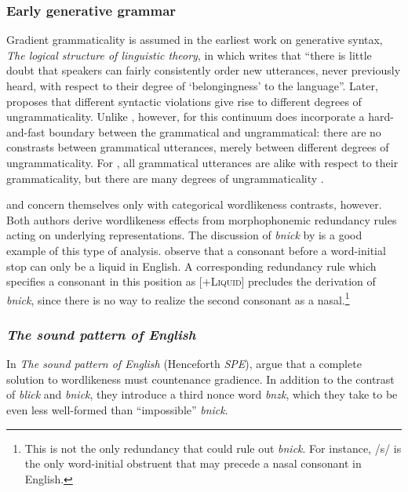 \subsubsection{Early generative grammar}

Gradient grammaticality is assumed in the earliest work on generative syntax, \emph{The logical structure of linguistic theory}, in which \citet[][132]{LSLT} writes that ``there is little doubt that speakers can fairly consistently order new utterances, never previously heard, with respect to their degree of `belongingness' to the language''. Later, \citet{ASPECTS} proposes that different syntactic violations give rise to different degrees of ungrammaticality. Unlike \citeauthor{Fischer-Jorgensen1952}, however, for \citeauthor{LSLT} this continuum does incorporate a hard-and-fast boundary between the grammatical and ungrammatical: there are no constrasts between grammatical utterances, merely between different degrees of ungrammaticality. For \citeauthor{LSLT}, all grammatical utterances are alike with respect to their grammaticality, but there are many degrees of ungrammaticality \citep[][61]{Schutze1996}.

\citet{Halle1962} and \citet{Stanley1967} concern themselves only with categorical wordlikeness contrasts, however. Both authors derive wordlikeness effects from morphophonemic redundancy rules acting on underlying representations. The discussion of \emph{bnick} by \citet[][101]{Chomsky1965} is a good example of this type of analysis. \citeauthor{Chomsky1965} observe that a consonant before a word-initial stop can only be a liquid in English. A corresponding redundancy rule which specifies a consonant in this position as [$+$\textsc{Liquid}] precludes the derivation of \emph{bnick}, since there is no way to realize the second consonant as a nasal.\footnote{This is not the only redundancy that could rule out \emph{bnick}. For instance, /s/ is the only word-initial obstruent that may precede a nasal consonant in English.}

\subsubsection{\emph{The sound pattern of English}} \label{2spe}

In \emph{The sound pattern of English} (Henceforth \emph{SPE}), \citet{SPE} argue that a complete solution to wordlikeness must countenance gradience. In addition to the contrast of \emph{blick} and \emph{bnick}, they introduce a third nonce word \emph{bnzk}, which they take to be even less well-formed than ``impossible'' \emph{bnick}. 

